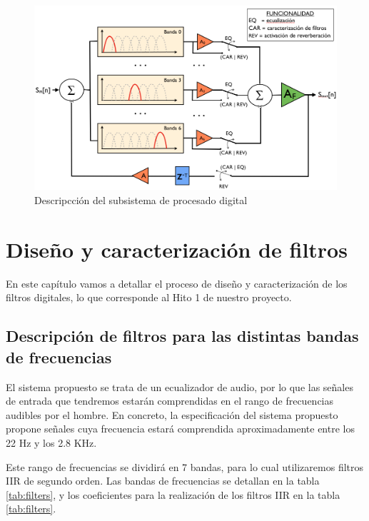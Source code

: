 \documentclass[a4paper,12pt]{article}
\begin{document}
\begin{figure}[hbt]
\includegraphics[width=\textwidth]{img/digital_proc.png} 
\caption{Descripcción del subsistema de procesado digital} \label{fig:digproc}
\end{figure}

\section{Diseño y caracterización de filtros}
En este capítulo vamos a detallar el proceso de diseño y caracterización de los filtros digitales, lo que corresponde al Hito 1 de nuestro proyecto.

\subsection{Descripción de filtros para las distintas bandas de frecuencias}
El sistema propuesto se trata de un ecualizador de audio, por lo que las señales de entrada que tendremos estarán comprendidas en el rango de frecuencias audibles por el hombre. En concreto, la especificación del sistema propuesto propone señales cuya frecuencia estará comprendida aproximadamente entre los 22 Hz y los 2.8 KHz.

Este rango de frecuencias se dividirá en 7 bandas, para lo cual utilizaremos filtros IIR de segundo orden. Las bandas de frecuencias se detallan en la tabla \ref{tab:filters}, y los coeficientes para la realización de los filtros IIR en la tabla \ref{tab:filters}.
\end{document}
